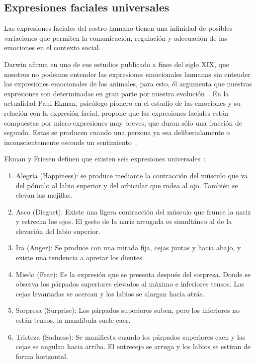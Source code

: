 \subsection{Expresiones faciales universales}
\label{sec:type_fe}

Las expresiones faciales del rostro humano tienen una infinidad de posibles variaciones que permiten la comunicación, regulación y adecuación de las emociones en el contexto social.

Darwin afirma en uno de  sus estudios publicado a fines del siglo XIX, que nosotros no podemos entender las expresiones emocionales humanas sin entender las expresiones emocionales de los animales, para esto, él argumenta que nuestras expresiones son determinadas en gran parte por nuestra evolución~\cite{Darwin1956,Darwin1998}. En la actualidad Paul Ekman, psicólogo pionero en el estudio de las emociones y su relación con la expresión facial, propone que las expresiones faciales están compuestas por micro-expresiones muy breves, que duran sólo una fracción de segundo. Estas se producen cuando una persona ya sea deliberadamente o inconscientemente esconde un sentimiento~\cite{Ekman1981}.

\newpage
Ekman y Friesen definen que existen seis expresiones universales~\cite{Ekman2003}: 

\begin{enumerate}
	\item Alegría (Happiness): se produce mediante la contracción del músculo que va del pómulo al labio superior y del orbicular que rodea al ojo. También se elevan las mejillas. 
	\item Asco (Disgust): Existe una ligera contracción del músculo que frunce la nariz y estrecha los ojos. El gesto de la nariz arrugada es simultáneo al de la elevación del labio superior. 
	\item Ira (Anger): Se produce con una mirada fija, cejas juntas y hacia abajo, y existe una tendencia a apretar los dientes. 
	\item Miedo (Fear): Es la expresión que se presenta después del sorpresa. Donde se observa los párpados superiores elevados al máximo e inferiores tensos. Las cejas levantadas se acercan y los labios se alargan hacia atrás. 
	\item Sorpresa (Surprise): Los párpados superiores suben, pero los inferiores no están tensos, la mandíbula suele caer. 
	\item Tristeza (Sadness): Se manifiesta cuando los párpados superiores caen y las cejas se angulan hacia arriba. El entrecejo se arruga y los labios se estiran de forma horizontal.
\end{enumerate}


